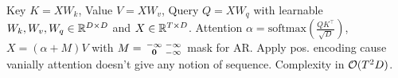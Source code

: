 \begin{definition}[Transformer]
    Key \(K= XW_k\), Value \(V = XW_v\), Query \(Q = XW_q\) with learnable \(W_k, W_v, W_q \in \mathbb{R}^{D \times D}\) and \(X \in \mathbb{R}^{T \times D}\).
    Attention \(\alpha = \text{softmax}\left(\frac{QK^\top}{\sqrt D}\right)\), \(X = (\alpha + M)V\) with \(M = \begin{smallmatrix}-\infty & -\infty \\ \vb{0} & -\infty\end{smallmatrix}\) mask for AR.
    Apply pos. encoding cause vanially attention doesn't give any notion of sequence.
    Complexity in \(\mathcal{O}(T^2D)\).
\end{definition}
